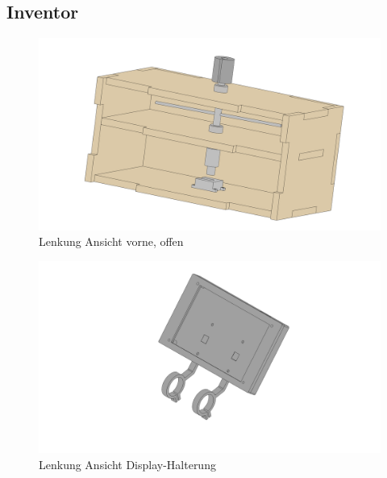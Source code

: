 \subsection{Inventor}
\begin{figure}[H]
    \centering
    \includegraphics[width=.99\textwidth]{../Inventor/Lenker/png/Lenkung_offen.png}
    \caption{Lenkung Ansicht vorne, offen}
\end{figure}
\begin{figure}[H]
    \centering
    \includegraphics[width=.99\textwidth]{../Inventor/Lenker/png/Lenkung_Display.png}
    \caption{Lenkung Ansicht Display-Halterung}
\end{figure}

